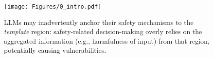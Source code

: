 \begin{figure}[t]
  \centering
  \texttt{[image: Figures/0\_intro.pdf]}
  \caption{LLMs may inadvertently anchor their safety mechanisms to the \textit{template} region: safety-related decision-making overly relies on the aggregated information (e.g., harmfulness of input) from that region, potentially causing vulnerabilities.}
  \label{fig:intro}
\end{figure}

